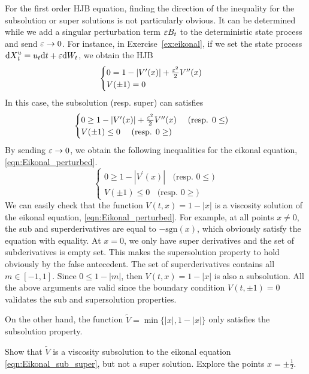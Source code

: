\documentclass[11pt]{book}
\newcommand{\dt}{\text{\normalfont d}t}
\newcommand{\dX}{\text{\normalfont d}X}
\newcommand{\dW}{\text{\normalfont d}W}
\begin{document}
For the first order HJB equation, finding the direction of the inequality for the subsolution or super solutions is not particularly obvious. It can be determined while we add a singular perturbation term $\varepsilon B_t$ to the deterministic state process and send $\varepsilon\to0$. For instance, in Exercise~\ref{ex:eikonal}, if we set the state process ${\dX}_t^u=u_t{{\dt}}+\eps \dW_t$, we obtain the HJB 
\begin{equation}\label{eqn:Eikonal_perturbed}
\begin{cases}
		0=1-|V^{\prime}(x)|+\frac{\varepsilon^2}{2}V^{\prime\prime}(x)\\
		V(\pm1)=0
\end{cases}
\end{equation}
In this case, the subsolution (resp. super) can satisfies
\begin{equation}
\begin{cases}
		0\ge1-|V^{\prime}(x)|+\frac{\varepsilon^2}{2}V^{\prime\prime}(x)~~~~\textrm{(resp. $0\le$)}\\
		V(\pm1)\le0~~~~\textrm{(resp. $0\ge$)}
\end{cases}
\end{equation}
By sending $\varepsilon\to0$, we obtain the following inequalities for the eikonal equation, \eqref{eqn:Eikonal_perturbed}.
\begin{equation}\label{eqn:Eikonal_sub_super}
\begin{cases}
		0\ge1-|V^{\prime}(x)|~~~~\textrm{(resp. $0\le$)}\\
		V(\pm1)\le0~~~~\textrm{(resp. $0\ge$)}
\end{cases}
\end{equation}
We can easily check that the function $V(t,x)=1-|x|$ is a viscosity solution of the eikonal equation, \eqref{eqn:Eikonal_perturbed}. For example, at all points $x\neq0$, the sub and superderivatives are equal to $-\textrm{sgn}(x)$, which obviously satisfy the equation with equality. At $x=0$, we only have super derivatives and the set of subderivatives is empty set. This makes the supersolution property to hold obviously by the false antecedent. The set of superderivatives contains all $m\in[-1,1]$. Since $0\le1-|m|$, then $V(t,x)=1-|x|$ is also a subsolution. All the above arguments are valid since the boundary condition $V(t,\pm1)=0$ validates the sub and supersolution properties. 

On the other hand, the function $\tilde{V}=\min\{|x|,1-|x|\}$ only satisfies the subsolution property. 
\begin{ex}
Show that $\tilde{V}$ is a viscosity subsolution to the eikonal equation \eqref{eqn:Eikonal_sub_super}, but not a super solution. Explore the points $x=\pm\frac12$.
\end{ex}
\end{document}
